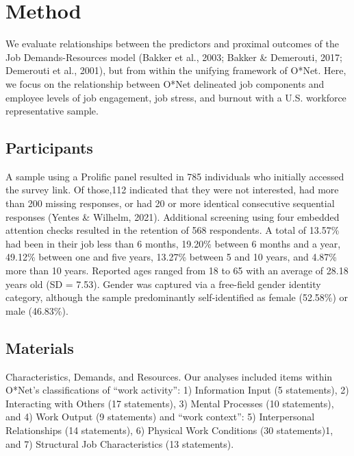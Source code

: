 \documentclass[
  man]{apa6}
\begin{document}
\hypertarget{method}{%
\section{Method}\label{method}}

We evaluate relationships between the predictors and proximal outcomes of the Job Demands-Resources model (Bakker et al., 2003; Bakker \& Demerouti, 2017; Demerouti et al., 2001), but from within the unifying framework of O*Net. Here, we focus on the relationship between O*Net delineated job components and employee levels of job engagement, job stress, and burnout with a U.S. workforce representative sample.

\hypertarget{participants}{%
\subsection{Participants}\label{participants}}

A sample using a Prolific panel resulted in 785 individuals who initially accessed the survey link. Of those,112 indicated that they were not interested, had more than 200 missing responses, or had 20 or more identical consecutive sequential responses (Yentes \& Wilhelm, 2021). Additional screening using four embedded attention checks resulted in the retention of 568 respondents. A total of 13.57\% had been in their job less than 6 months, 19.20\% between 6 months and a year, 49.12\% between one and five years, 13.27\% between 5 and 10 years, and 4.87\% more than 10 years. Reported ages ranged from 18 to 65 with an average of 28.18 years old (SD = 7.53). Gender was captured via a free-field gender identity category, although the sample predominantly self-identified as female (52.58\%) or male (46.83\%).

\hypertarget{materials}{%
\subsection{Materials}\label{materials}}

Characteristics, Demands, and Resources. Our analyses included items within O*Net's classifications of ``work activity'': 1) Information Input (5 statements), 2) Interacting with Others (17 statements), 3) Mental Processes (10 statements), and 4) Work Output (9 statements) and ``work context'': 5) Interpersonal Relationships (14 statements), 6) Physical Work Conditions (30 statements)1, and 7) Structural Job Characteristics (13 statements).
\end{document}
